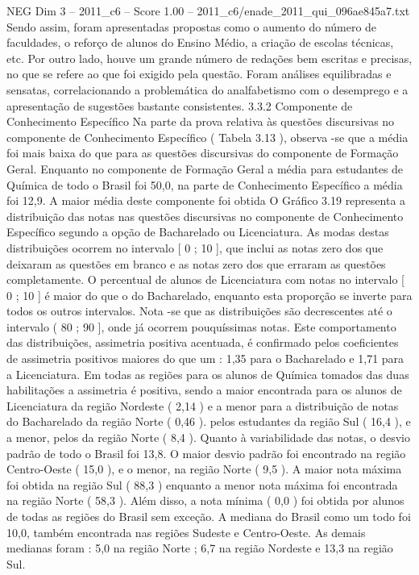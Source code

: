 \begin{textsample}{NEG Dim 3 – 2011\_c6 – Score 1.00 – 2011\_c6/enade\_2011\_qui\_096ae845a7.txt}
Sendo assim, foram apresentadas propostas como o aumento do número de faculdades, o reforço de alunos do Ensino Médio, a criação de escolas técnicas, etc.
Por outro lado, houve um grande número de redações bem escritas e precisas, no que se refere ao que foi exigido pela questão.
Foram análises equilibradas e sensatas, correlacionando a problemática do analfabetismo com o desemprego e a apresentação de sugestões bastante consistentes. 3.3.2 Componente de Conhecimento Específico Na parte da prova relativa às questões discursivas no componente de Conhecimento Específico ( Tabela 3.13 ), observa -se que a média foi mais baixa do que para as questões discursivas do componente de Formação Geral.
Enquanto no componente de Formação Geral a média para estudantes de Química de todo o Brasil foi 50,0, na parte de Conhecimento Específico a média foi 12,9.
A maior média deste componente foi obtida O Gráfico 3.19 representa a distribuição das notas nas questões discursivas no componente de Conhecimento Específico segundo a opção de Bacharelado ou Licenciatura.
As modas destas distribuições ocorrem no intervalo [ 0 ; 10 ], que inclui as notas zero dos que deixaram as questões em branco e as notas zero dos que erraram as questões completamente.
O percentual de alunos de Licenciatura com notas no intervalo [ 0 ; 10 ] é maior do que o do Bacharelado, enquanto esta proporção se inverte para todos os outros intervalos.
Nota -se que as distribuições são decrescentes até o intervalo ( 80 ; 90 ], onde já ocorrem pouquíssimas notas.
Este comportamento das distribuições, assimetria positiva acentuada, é confirmado pelos coeficientes de assimetria positivos maiores do que um : 1,35 para o Bacharelado e 1,71 para a Licenciatura.
Em todas as regiões para os alunos de Química tomados das duas habilitações a assimetria é positiva, sendo a maior encontrada para os alunos de Licenciatura da região Nordeste ( 2,14 ) e a menor para a distribuição de notas do Bacharelado da região Norte ( 0,46 ). pelos estudantes da região Sul ( 16,4 ), e a menor, pelos da região Norte ( 8,4 ).
Quanto à variabilidade das notas, o desvio padrão de todo o Brasil foi 13,8.
O maior desvio padrão foi encontrado na região Centro-Oeste ( 15,0 ), e o menor, na região Norte ( 9,5 ).
A maior nota máxima foi obtida na região Sul ( 88,3 ) enquanto a menor nota máxima foi encontrada na região Norte ( 58,3 ).
Além disso, a nota mínima ( 0,0 ) foi obtida por alunos de todas as regiões do Brasil sem exceção.
A mediana do Brasil como um todo foi 10,0, também encontrada nas regiões Sudeste e Centro-Oeste.
As demais medianas foram : 5,0 na região Norte ; 6,7 na região Nordeste e 13,3 na região Sul.

\end{textsample}
